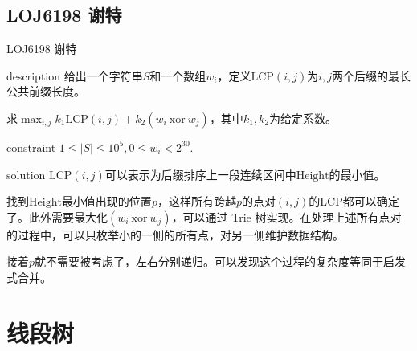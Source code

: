 \documentclass{beamer}
\begin{document}
\subsection{LOJ6198 谢特}
\begin{frame}{LOJ6198 谢特}
	\begin{block}{description}
		给出一个字符串$S$和一个数组$w_i$，定义$\mathrm{LCP}(i, j)$为$i, j$两个后缀的最长公共前缀长度。
		
		求$\max_{i, j}k_1\mathrm{LCP}(i, j) + k_2(w_i \ \mathrm{xor}\ w_j)$，其中$k_1, k_2$为给定系数。
	\end{block}
	\begin{block}{constraint}
		$1 \le |S| \le 10^5, 0 \le w_i < 2^{30}.$
	\end{block}
	\pause
	\begin{block}{solution}
		$\mathrm{LCP}(i, j)$可以表示为后缀排序上一段连续区间中$\mathrm{Height}$的最小值。
		\pause
		
		找到$\mathrm{Height}$最小值出现的位置$p$，这样所有跨越$p$的点对$(i, j)$的$\mathrm{LCP}$都可以确定了。此外需要最大化$(w_i\ \mathrm{xor}\ w_j)$，可以通过 Trie 树实现。在处理上述所有点对的过程中，可以只枚举小的一侧的所有点，对另一侧维护数据结构。
		
		接着$p$就不需要被考虑了，左右分别递归。可以发现这个过程的复杂度等同于启发式合并。
	\end{block}
\end{frame}


\section{线段树}
\end{document}
